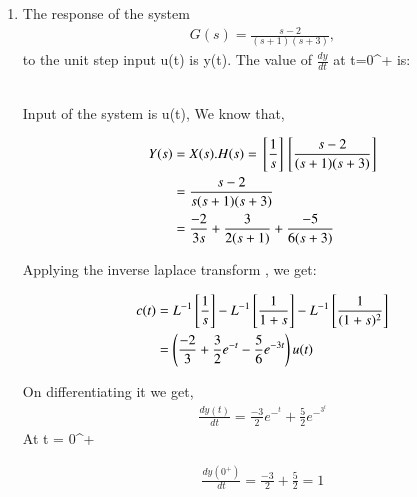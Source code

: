 \begin{enumerate}[label=\thesection.\arabic*.,ref=\thesection.\theenumi]
\item
The response of the system
\begin{align}
     G(s)= \frac{s-2}{(s+1)(s+3)} ,
\end{align} 
to the unit step input u(t) is y(t). The value of \(\frac{dy}{dt}\) at t=0^+ is:

\\
\solution 
Input of the system is u(t),
We know that, 

 \begin{align}
    Y(s) &= X(s).H(s) = {}\left[\frac{1}{s}\right]{}\left[\frac{s-2}{(s+1)(s+3)}\right]
    \\
    &= \frac{s-2}{s(s+1)(s+3)}
    \\
    &= \frac{-2}{3s} + \frac{3}{2(s+1)} + \frac{-5}{6(s+3)}
 \end{align}

Applying the inverse laplace transform , we get:

 \begin{align}
    c(t) &= L^{-1} {}\left[ \frac{1}{s}\right] - L^{-1}{}\left[\frac{1}{1+s}\right] - L^{-1}{}\left[\frac{1}{(1+s)^2}\right] 
    \\
    &= \left(\frac{-2}{3} + \frac{3}{2}e^{-t} - \frac{5}{6}e^{-3t}\right)  u(t)
    \label{eq:sec_order_op}
 \end{align}

On differentiating it we get,
 \begin{align}
    \frac{dy(t)}{dt} = \frac{-3}{2}e^-^t + \frac{5}{2}e^-^3^t
 \end{align}
At t = 0^+
 
 \begin{align}
    \frac{dy(0^+)}{dt} = \frac{-3}{2} + \frac{5}{2} = 1
 \end{align}



\end{enumerate}
    

